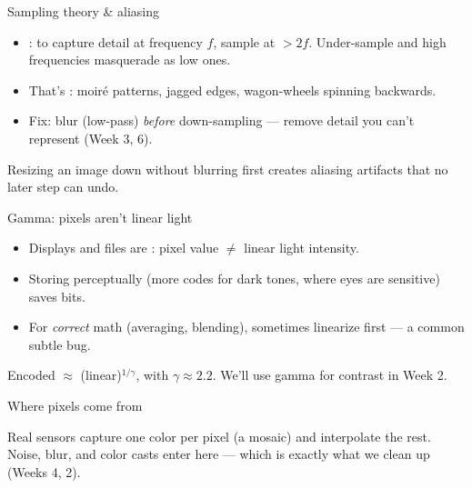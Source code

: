 \documentclass[10pt,aspectratio=169]{beamer}
\begin{document}
\begin{frame}{Sampling theory \& aliasing}
  \begin{itemize}
    \item {}: to capture detail at frequency $f$, sample at $>2f$. Under-sample and high frequencies masquerade as low ones.
    \item That's : moir\'e patterns, jagged edges, wagon-wheels spinning backwards.
    \item Fix: blur (low-pass) \emph{before} down-sampling — remove detail you can't represent (Week 3, 6).
  \end{itemize}
  \begin{badbox}
    Resizing an image down without blurring first creates aliasing artifacts that no later step can undo.
  \end{badbox}
\end{frame}

\begin{frame}{Gamma: pixels aren't linear light}
  \begin{itemize}
    \item Displays and files are : pixel value $\ne$ linear light intensity.
    \item Storing perceptually (more codes for dark tones, where eyes are sensitive) saves bits.
    \item For \emph{correct} math (averaging, blending), sometimes linearize first — a common subtle bug.
  \end{itemize}
  \begin{mathbox}
    Encoded $\approx$ (linear)$^{1/\gamma}$, with $\gamma\approx 2.2$. We'll use gamma for contrast in Week 2.
  \end{mathbox}
\end{frame}

\begin{frame}{Where pixels come from}
  \begin{center}
  \end{center}
  Real sensors capture one color per pixel (a  mosaic) and interpolate the rest.
  Noise, blur, and color casts enter here — which is exactly what we clean up (Weeks 4, 2).
\end{frame}
\end{document}
